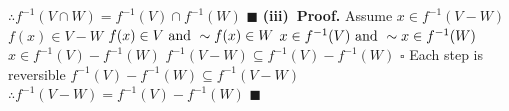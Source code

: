 \documentclass[12pt]{article}
\begin{document}
	\(\therefore f^{-1}(V\cap W)=f^{-1}(V)\cap f^{-1}(W)\)
	\newline \(\blacksquare\) \newline
	\newline
	\textbf{(iii)\ Proof.}
	Assume \(x \in f^{-1}(V-W)\)
	\newline
	\(f(x) \in V-W\)
	\newline
	\(f(x) \in V \textup{ and }\sim f(x) \in W\)
	\newline
	\(x \in f^{-1}(V) \textup{ and }\sim x \in f^{-1}(W)\)
	\newline
	\(x \in f^{-1}(V) - f^{-1}(W)\)
	\newline
	\(f^{-1}(V-W) \subseteq f^{-1}(V) - f^{-1}(W)\)
	\newline \(\square\) \newline
	Each step is reversible
	\newline
	\(f^{-1}(V) - f^{-1}(W) \subseteq f^{-1}(V-W)\)
	\newline
	\(\therefore f^{-1}(V - W)=f^{-1}(V) - f^{-1}(W)\)
	\newline \(\blacksquare\)
	\newpage
\end{document}
